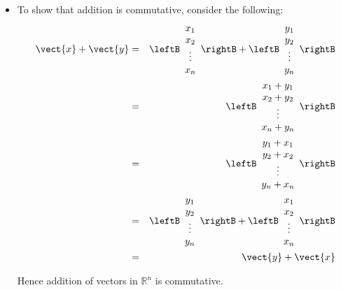 \begin{solution}
\begin{itemize}
\item
To show that addition is commutative, consider the following:
\begin{eqnarray*}
\vect{x} + \vect{y} &=& \leftB \begin{array}{c}
x_1 \\
x_2 \\
\vdots \\
x_n
\end{array} \rightB + \leftB \begin{array}{c}
y_1 \\
y_2 \\
\vdots \\
y_n
\end{array} \rightB \\
&=& \leftB \begin{array}{c}
x_1 + y_1 \\
x_2 + y_2 \\
\vdots \\
x_n + y_n 
\end{array} \rightB \\ 
&=& \leftB \begin{array}{c}
y_1 + x_1 \\
y_2 + x_2 \\
\vdots \\
y_n + x_n 
\end{array} \rightB \\ 
&=& \leftB \begin{array}{c}
y_1 \\
y_2 \\
\vdots \\
y_n
\end{array} \rightB + \leftB \begin{array}{c}
x_1 \\
x_2 \\
\vdots \\
x_n
\end{array} \rightB \\
&=& \vect{y} + \vect{x}
\end{eqnarray*}

Hence addition of vectors in $\mathbb{R}^n$ is commutative. 


\end{itemize}
\end{solution}
